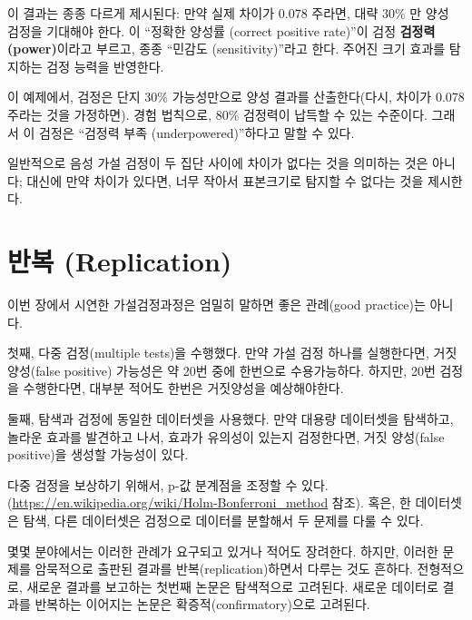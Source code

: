 이 결과는 종종 다르게 제시된다: 만약 실제 차이가 0.078 주라면, 
대략 30\% 만 양성 검정을 기대해야 한다. 
이 ``정확한 양성률 (correct positive rate)''이 검정 {\bf 검정력(power)}이라고 부르고, 종종 ``민감도 (sensitivity)''라고 한다. 주어진 크기 효과를 탐지하는 검정 능력을 반영한다.

이 예제에서, 검정은 단지 30\% 가능성만으로 양성 결과를 산출한다(다시, 차이가 0.078 주라는 것을 가정하면). 경험 법칙으로, 80\% 검정력이 납득할 수 있는 수준이다. 그래서 이 검정은 ``검정력 부족 (underpowered)''하다고 말할 수 있다.

일반적으로 음성 가설 검정이 두 집단 사이에 차이가 없다는 것을 의미하는 것은 아니다; 대신에 만약 차이가 있다면, 너무 작아서 표본크기로 탐지할 수 없다는 것을 제시한다.

\section{반복 (Replication)}
\label{replication}

이번 장에서 시연한 가설검정과정은 엄밀히 말하면 좋은 관례(good practice)는 아니다.

첫째, 다중 검정(multiple tests)을 수행했다. 만약 가설 검정 하나를 실행한다면, 거짓양성(false positive) 가능성은 약 20번 중에 한번으로 수용가능하다. 하지만, 20번 검정을 수행한다면, 대부분 적어도 한번은 거짓양성을 예상해야한다.

둘째, 탐색과 검정에 동일한 데이터셋을 사용했다. 만약 대용량 데이터셋을 탐색하고, 놀라운 효과를 발견하고 나서, 효과가 유의성이 있는지 검정한다면, 거짓 양성(false positive)을 생성할 가능성이 있다.


다중 검정을 보상하기 위해서, p-값 분계점을 조정할 수 있다. (\url{https://en.wikipedia.org/wiki/Holm-Bonferroni_method} 참조). 혹은, 한 데이터셋은 탐색, 다른 데이터셋은 검정으로 데이터를 분할해서 두 문제를 다룰 수 있다. 

몇몇 분야에서는 이러한 관례가 요구되고 있거나 적어도 장려한다. 하지만, 이러한 문제를 암묵적으로 출판된 결과를 반복(replication)하면서 다루는 것도 흔하다. 전형적으로, 새로운 결과를 보고하는 첫번째 논문은 탐색적으로 고려된다. 새로운 데이터로 결과를 반복하는 이어지는 논문은 확증적(confirmatory)으로 고려된다.

